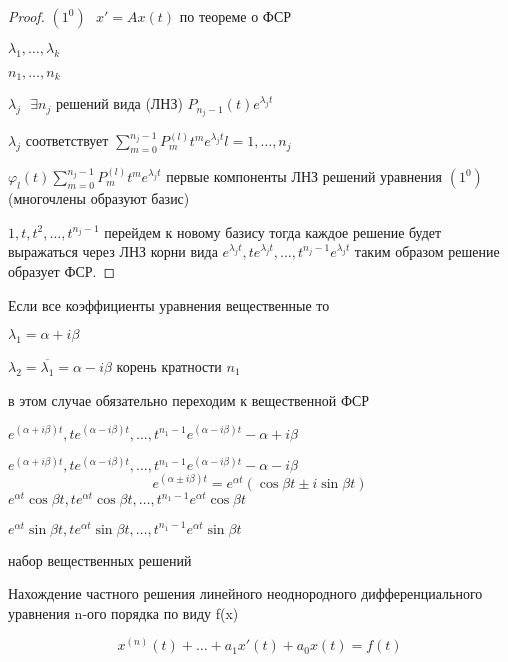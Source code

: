 \begin{proof}
  $(1^0) ~~~ x' = Ax(t)$ по теореме о ФСР

  $\lambda_1, \ldots, \lambda_k$

  $n_1, \ldots, n_k$

  $\lambda_j ~~~ \exists n_j$ решений вида (ЛНЗ) $P_{n_j - 1}(t)e^{\lambda_j t}$

  $\lambda_j$ соответствует $\sum_{m=0}^{n_j - 1} P^{(l)}_m t^m e^{\lambda_j t}
  l = 1, \ldots, n_j$

  $\varphi_l(t)\sum_{m=0}^{n_j - 1} P^{(l)}_m t^m e^{\lambda_j t}$ первые
  компоненты ЛНЗ решений уравнения $(1^0)$ (многочлены образуют базис)

  $1, t, t^2, \ldots, t^{n_j - 1}$ перейдем к новому базису тогда каждое решение
  будет выражаться через ЛНЗ корни вида $e^{\lambda_j t}, te^{\lambda_j t},
  \ldots, t^{n_j - 1} e^{\lambda_j t}$ таким образом решение образует ФСР.
\end{proof}

\begin{block}[Замечание]
  Если все коэффициенты уравнения вещественные то

  $\lambda_1 = \alpha+ i\beta$

  $\lambda_2 = \overline{\lambda_1} = \alpha - i\beta$ корень кратности $n_1$

  в этом случае обязательно переходим к вещественной ФСР

  $e^{(\alpha + i\beta)t}, te^{(\alpha - i\beta)t}, \ldots,
  t^{n_1 - 1}e^{(\alpha - i\beta)t} - \alpha + i\beta$

  $e^{(\alpha + i\beta)t}, te^{(\alpha - i\beta)t}, \ldots,
  t^{n_1 - 1}e^{(\alpha - i\beta)t} - \alpha - i\beta$
  $$
  e^{(\alpha \pm i\beta)t} = e^{\alpha t}(\cos \beta t \pm i \sin \beta t)
  $$
  $e^{\alpha t} \cos \beta t, t e^{\alpha t} \cos \beta t, \ldots,
  t^{n_1 - 1} e^{\alpha t} \cos \beta t$

  $e^{\alpha t} \sin \beta t, t e^{\alpha t} \sin \beta t, \ldots,
  t^{n_1 - 1} e^{\alpha t} \sin \beta t$

  набор вещественных решений
\end{block}

\begin{title}[\Large]
  Нахождение частного решения линейного неоднородного дифференциального
  уравнения n-ого порядка по виду f(x)
\end{title}

\begin{define}
  $$
  x^{(n)}(t) + \ldots + a_1 x'(t) + a_0 x(t) = f(t)
  $$
\end{define}

